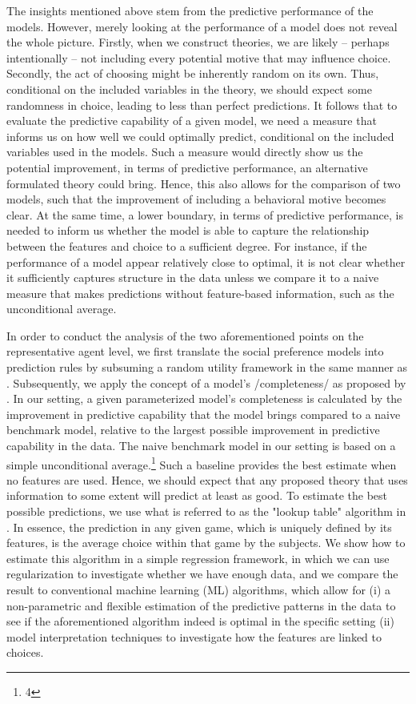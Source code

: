 \documentclass[letterpaper,11pt,leqno]{article}
\begin{document}
The insights mentioned above stem from the predictive performance of the models. However, merely looking at the performance of a model does not reveal the whole picture. Firstly, when we construct theories, we are likely -- perhaps intentionally -- not including every potential motive that may influence choice. Secondly, the act of choosing might be inherently random on its own. Thus, conditional on the included variables in the theory, we should expect some randomness in choice, leading to less than perfect predictions. It follows that to evaluate the predictive capability of a given model, we need a measure that informs us on how well we could optimally predict, conditional on the included variables used in the models. Such a measure would directly show us the potential improvement, in terms of predictive performance, an alternative formulated theory could bring. Hence, this also allows for the comparison of two models, such that the improvement of including a behavioral motive becomes clear. At the same time, a lower boundary, in terms of predictive performance, is needed to inform us whether the model is able to capture the relationship between the features and choice to a sufficient degree. For instance, if the performance of a model appear relatively close to optimal, it is not clear whether it sufficiently captures structure in the data unless we compare it to a naive measure that makes predictions without feature-based information, such as the unconditional average.

In order to conduct the analysis of the two aforementioned points on the representative agent level, we first translate the social preference models into prediction rules by subsuming a random utility framework in the same manner as \cite{Bruhin2019}. Subsequently, we apply the concept of a model's /completeness/ as proposed by \cite{Fudenberg2022}. In our setting, a given parameterized model's completeness is calculated by the improvement in predictive capability that the model brings compared to a naive benchmark model, relative to the largest possible improvement in predictive capability in the data. The naive benchmark model in our setting is based on a simple unconditional average.\footnote{4} Such a baseline provides the best estimate when no features are used. Hence, we should expect that any proposed theory that uses information to some extent will predict at least as good. To estimate the best possible predictions, we use what is referred to as the "lookup table" algorithm in \cite{Fudenberg2022}. In essence, the prediction in any given game, which is uniquely defined by its features, is the average choice within that game by the subjects. We show how to estimate this algorithm in a simple regression framework, in which we can use regularization to investigate whether we have enough data, and we compare the result to conventional machine learning (ML) algorithms, which allow for (i) a non-parametric and flexible estimation of the predictive patterns in the data to see if the aforementioned algorithm indeed is optimal in the specific setting (ii) model interpretation techniques to investigate how the features are linked to choices. 
\end{document}
